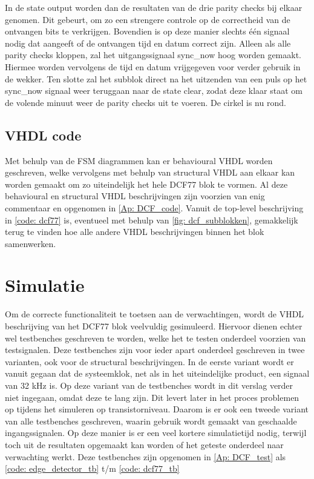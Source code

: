 \noindent In de state output worden dan de resultaten van de drie parity checks bij elkaar genomen. Dit gebeurt, om zo een strengere controle op de correctheid van de ontvangen bits te verkrijgen. Bovendien is op deze manier slechts \'e\'en signaal nodig dat aangeeft of de ontvangen tijd en datum correct zijn. Alleen als alle parity checks kloppen, zal het uitgangssignaal sync\_now hoog worden gemaakt. Hiermee worden vervolgens de tijd en datum vrijgegeven voor verder gebruik in de wekker. Ten slotte zal het subblok direct na het uitzenden van een puls op het sync\_now signaal weer teruggaan naar de state clear, zodat deze klaar staat om de volende minuut weer de parity checks uit te voeren. De cirkel is nu rond.

\subsection{VHDL code}
Met behulp van de FSM diagrammen kan er behavioural VHDL worden geschreven, welke vervolgens met behulp van structural VHDL aan elkaar kan worden gemaakt om zo uiteindelijk het hele DCF77 blok te vormen. Al deze behavioural en structural VHDL beschrijvingen zijn voorzien van enig commentaar en opgenomen in \cref{Ap: DCF_code}. Vanuit de top-level beschrijving in \cref{code: dcf77} is, eventueel met behulp van \cref{fig: dcf_subblokken}, gemakkelijk terug te vinden hoe alle andere VHDL beschrijvingen binnen het blok samenwerken.

\section{Simulatie}
Om de correcte functionaliteit te toetsen aan de verwachtingen, wordt de VHDL beschrijving van het DCF77 blok veelvuldig gesimuleerd. Hiervoor dienen echter wel testbenches geschreven te worden, welke het te testen onderdeel voorzien van testsignalen. Deze testbenches zijn voor ieder apart onderdeel geschreven in twee varianten, ook voor de structural beschrijvingen. In de eerste variant wordt er vanuit gegaan dat de systeemklok, net als in het uiteindelijke product, een signaal van 32 kHz is. Op deze variant van de testbenches wordt in dit verslag verder niet ingegaan, omdat deze te lang zijn. Dit levert later in het proces problemen op tijdens het simuleren op transistorniveau. Daarom is er ook een tweede variant van alle testbenches geschreven, waarin gebruik wordt gemaakt van geschaalde ingangssignalen. Op deze manier is er een veel kortere simulatietijd nodig, terwijl toch uit de resultaten opgemaakt kan worden of het geteste onderdeel naar verwachting werkt. Deze testbenches zijn opgenomen in \cref{Ap: DCF_test} als \cref{code: edge_detector_tb} t/m \cref{code: dcf77_tb}\\

